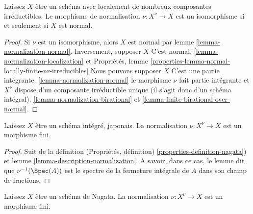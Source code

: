 \begin{lemma}

\label{lemma-normalization-trivial}
Laissez $X$ être un schéma avec localement de nombreux composantes irréductibles. Le morphisme de normalisation $\nu : X^\nu \to X$ est un isomorphisme si et seulement si $X$ est normal.
\end{lemma}

\begin{proof}

Si $\nu$ est un isomorphisme, alors $X$ est normal par lemme \ref{lemma-normalization-normal}. Inversement, supposer $X$ C'est normal. \ref{lemma-normalization-localization} et Propriétés, lemme \ref{properties-lemma-normal-locally-finite-nr-irreducibles}
Nous pouvons supposer $X$ C'est une partie intégrante. \ref{lemma-normalization-normal} le morphisme
$\nu$ fait partie intégrante et $X^\nu$ dispose d'un composante irréductible unique (il s'agit donc d'un schéma intégral). \ref{lemma-normalization-birational} et
\ref{lemma-finite-birational-over-normal}.

\end{proof}

\begin{lemma}

\label{lemma-Japanese-normalization}
Laissez $X$ être un schéma intégré, japonais. La normalisation $\nu : X^\nu \to X$ est un morphisme fini.
\end{lemma}

\begin{proof}

Suit de la définition (Propriétés, définition) \ref{properties-definition-nagata}) et lemme \ref{lemma-description-normalization}. A savoir, dans ce cas, le lemme dit que $\nu^{-1}(\Spec(A))$ est le spectre de la fermeture intégrale de $A$ dans son champ de fractions.

\end{proof}

\begin{lemma}

\label{lemma-nagata-normalization}
Laissez $X$ être un schéma de Nagata. La normalisation $\nu : X^\nu \to X$ est un morphisme fini.
\end{lemma}

